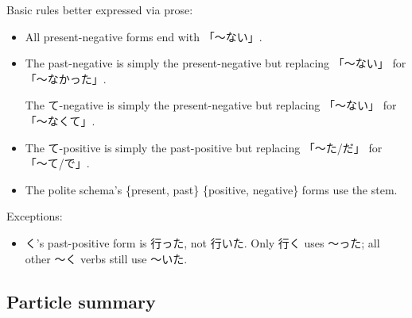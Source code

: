 \documentclass[../nihongo-gakushuu-kyouzai.tex]{subfiles}
\begin{document}
\color{orange}
Basic rules better expressed via prose:
\begin{itemize}
    \item All present-negative forms end with 「〜ない」.
    \item The past-negative is simply the present-negative but replacing 「〜ない」 for 「〜なかった」.

    The て-negative is simply the present-negative but replacing 「〜ない」 for 「〜なくて」.
    \item The て-positive is simply the past-positive but replacing 「〜た/だ」 for 「〜て/で」.
    \item The polite schema's \{present, past\} \times \{positive, negative\} forms use the stem.
\end{itemize}

\color{red}
Exceptions:
\begin{itemize}
    \item {}く's past-positive form is 行った, not 行いた. Only 行く uses 〜った; all other 〜く verbs still use 〜いた.
\end{itemize}

\color{black}


\subsection{Particle summary}
\end{document}
